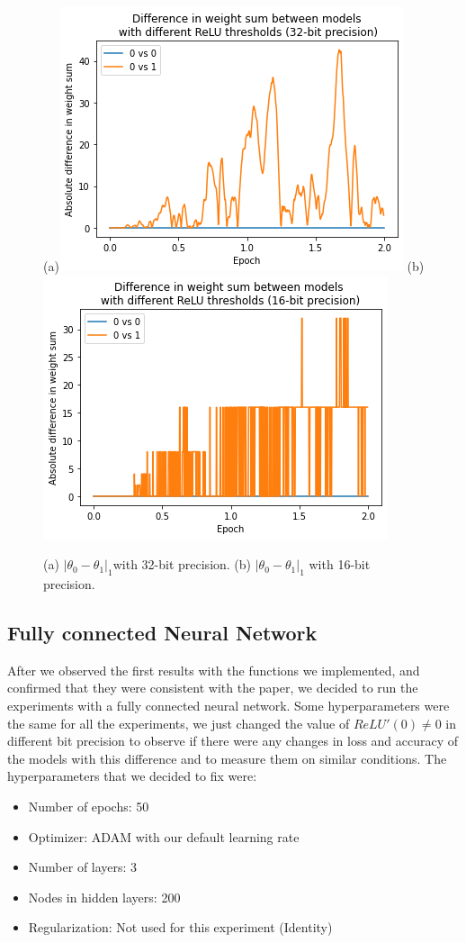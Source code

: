 \begin{figure}[htbp]
    \centering
        \subfigure(a){\includegraphics[width=0.4\columnwidth]{Images/Init_32.png}} 
        \subfigure(b){\includegraphics[width=0.4\columnwidth]{Images/Init_16.png}} 
    \caption{(a)  $|\theta_0 - \theta_1|_1 $with 32-bit precision. (b) $|\theta_0 - \theta_1|_1$ with 16-bit precision. }
    \label{fig:asdf}
\end{figure}

\subsection{Fully connected Neural Network} 

After we observed the first results with the functions we implemented, and confirmed that they were consistent with the paper, we decided to run the experiments with a fully connected neural network. Some hyperparameters were the same for all the experiments, we just changed the value of $ReLU'(0) \neq 0$ in different bit precision to observe if there were any changes in loss and accuracy of the models with this difference and to measure them on similar conditions. 
The hyperparameters that we decided to fix were: 
\begin{itemize}
\item Number of epochs: 50
\item Optimizer: ADAM with our default learning rate
\item Number of layers: 3
\item Nodes in hidden layers: 200
\item Regularization: Not used for this experiment (Identity)
\end{itemize}

